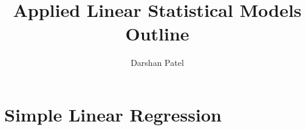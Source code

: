 \documentclass[11pt]{report}
\begin{document}
\title{Applied Linear Statistical Models \\ Outline}
\author{Darshan Patel}
\maketitle
\tableofcontents

\chapter{Simple Linear Regression} 

\end{document}
